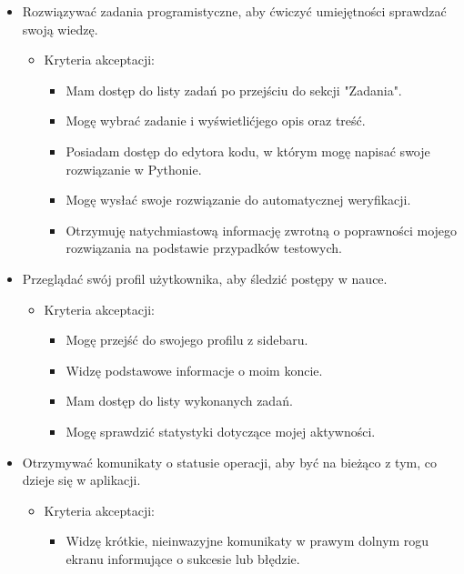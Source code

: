 \documentclass[shortabstract,inz]{iithesis}
\begin{document}
\begin{itemize}
    \item Rozwiązywać zadania programistyczne, aby ćwiczyć umiejętności sprawdzać swoją wiedzę.
    \begin{itemize}
        \item Kryteria akceptacji:
        \begin{itemize}
            \item Mam dostęp do listy zadań po przejściu do sekcji "Zadania".
            \item Mogę wybrać zadanie i wyświetlićjego opis oraz treść.
            \item Posiadam dostęp do edytora kodu, w którym mogę napisać swoje rozwiązanie w Pythonie.
            \item Mogę wysłać swoje rozwiązanie do automatycznej weryfikacji.
            \item Otrzymuję natychmiastową informację zwrotną o poprawności mojego rozwiązania na podstawie przypadków testowych.
        \end{itemize}
    \end{itemize}

    \item Przeglądać swój profil użytkownika, aby śledzić postępy w nauce.
    \begin{itemize}
        \item Kryteria akceptacji:
        \begin{itemize}
            \item Mogę przejść do swojego profilu z sidebaru.
            \item Widzę podstawowe informacje o moim koncie.
            \item Mam dostęp do listy wykonanych zadań.
            \item Mogę sprawdzić statystyki dotyczące mojej aktywności.
        \end{itemize}
    \end{itemize}

    \item Otrzymywać komunikaty o statusie operacji, aby być na bieżąco z tym, co dzieje się w aplikacji.
    \begin{itemize}
        \item Kryteria akceptacji:
        \begin{itemize}
            \item Widzę krótkie, nieinwazyjne komunikaty w prawym dolnym rogu ekranu informujące o sukcesie lub błędzie.
        \end{itemize}
    \end{itemize}
\end{itemize}
\end{document}
